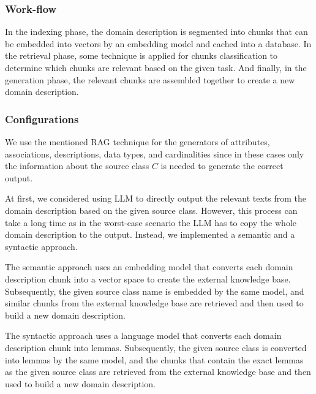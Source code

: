 \subsubsection{Work-flow}
\label{sec:RAG_work_flow_dd}

In the indexing phase, the domain description is segmented into chunks that can be embedded into vectors by an embedding model and cached into a database. In the retrieval phase, some technique is applied for chunks classification to determine which chunks are relevant based on the given task. And finally, in the generation phase, the relevant chunks are assembled together to create a new domain description.


\subsubsection{Configurations}
\label{sec:rag_configurations}

We use the mentioned RAG technique for the generators of attributes, associations, descriptions, data types, and cardinalities since in these cases only the information about the source class $C$ is needed to generate the correct output.

At first, we considered using LLM to directly output the relevant texts from the domain description based on the given source class. However, this process can take a long time as in the worst-case scenario the LLM has to copy the whole domain description to the output. Instead, we implemented a semantic and a syntactic approach.


The semantic approach uses an embedding model that converts each domain description chunk into a vector space to create the external knowledge base. Subsequently, the given source class name is embedded by the same model, and similar chunks from the external knowledge base are retrieved and then used to build a new domain description.

The syntactic approach uses a language model that converts each domain description chunk into lemmas. Subsequently, the given source class is converted into lemmas by the same model, and the chunks that contain the exact lemmas as the given source class are retrieved from the external knowledge base and then used to build a new domain description.


